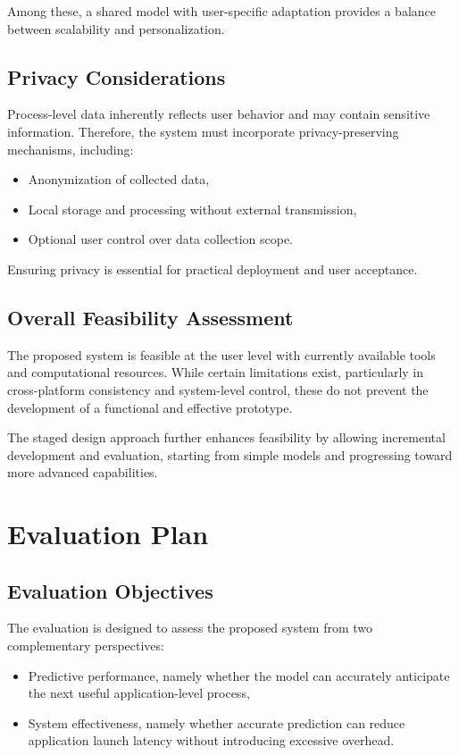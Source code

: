 \documentclass[11pt]{article}
\begin{document}
Among these, a shared model with user-specific adaptation provides a balance between scalability and personalization.

\subsection{Privacy Considerations}

Process-level data inherently reflects user behavior and may contain sensitive information. Therefore, the system must incorporate privacy-preserving mechanisms, including:

\begin{itemize}
\item Anonymization of collected data,
\item Local storage and processing without external transmission,
\item Optional user control over data collection scope.
\end{itemize}

Ensuring privacy is essential for practical deployment and user acceptance.

\subsection{Overall Feasibility Assessment}

The proposed system is feasible at the user level with currently available tools and computational resources. While certain limitations exist, particularly in cross-platform consistency and system-level control, these do not prevent the development of a functional and effective prototype.

The staged design approach further enhances feasibility by allowing incremental development and evaluation, starting from simple models and progressing toward more advanced capabilities.

\section{Evaluation Plan}

\subsection{Evaluation Objectives}

The evaluation is designed to assess the proposed system from two complementary perspectives:

\begin{itemize}
\item Predictive performance, namely whether the model can accurately anticipate the next useful application-level process,
\item System effectiveness, namely whether accurate prediction can reduce application launch latency without introducing excessive overhead.
\end{itemize}
\end{document}
